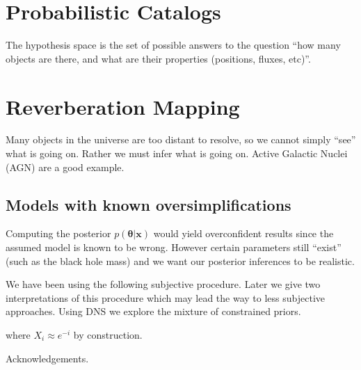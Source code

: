 \documentclass[
  ,final            %
  ]
  {aipproc}
\newcommand{\pars}{\boldsymbol{\theta}}
\newcommand{\data}{\mathbf{x}}
\begin{document}
\section{Probabilistic Catalogs}
The hypothesis space is the set of possible answers to the question
``how many objects are there, and what are their properties (positions, fluxes,
etc)''.


\section{Reverberation Mapping}
Many objects in the universe are too distant to resolve, so we cannot simply
``see'' what is going on. Rather we must infer what is going on. Active Galactic
Nuclei (AGN) are a good example.

\subsection{Models with known oversimplifications}
Computing the posterior $p(\pars | \data)$ would yield overconfident results
since the assumed model is known to be wrong. However certain parameters still
``exist'' (such as the black hole mass) and we want our posterior inferences
to be realistic.

We have been using the following subjective procedure. Later we give two
interpretations of this procedure which may lead the way to less subjective
approaches.
Using DNS we explore the mixture of constrained priors.

where $X_i \approx e^{-i}$ by construction.


\begin{theacknowledgments}
Acknowledgements.
\end{theacknowledgments}


\end{document}
